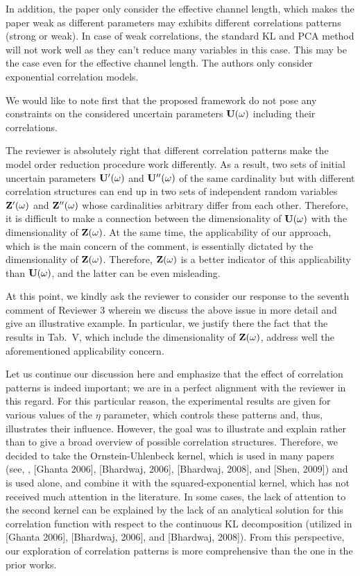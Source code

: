 \begin{reviewer}
In addition, the paper only consider the effective channel length, which makes the paper weak as different parameters may exhibits different correlations patterns (strong or weak). In case of weak correlations, the standard KL and PCA method will not work well as they can’t reduce many variables in this case. This may be the case even for the effective channel length. The authors only consider exponential correlation models.
\end{reviewer}
\begin{authors}
We would like to note first that the proposed framework do not pose any constraints on the considered uncertain parameters $\mathbf{U}(\omega)$ including their correlations.

The reviewer is absolutely right that different correlation patterns make the model order reduction procedure work differently.
As a result, two sets of initial uncertain parameters $\mathbf{U}'(\omega)$ and $\mathbf{U}''(\omega)$ of the same cardinality but with different correlation structures can end up in two sets of independent random variables $\mathbf{Z}'(\omega)$ and $\mathbf{Z}''(\omega)$ whose cardinalities arbitrary differ from each other.
Therefore, it is difficult to make a connection between the dimensionality of $\mathbf{U}(\omega)$ with the dimensionality of $\mathbf{Z}(\omega)$.
At the same time, the applicability of our approach, which is the main concern of the comment, is essentially dictated by the dimensionality of $\mathbf{Z}(\omega)$.
Therefore, $\mathbf{Z}(\omega)$ is a better indicator of this applicability than $\mathbf{U}(\omega)$, and the latter can be even misleading.

At this point, we kindly ask the reviewer to consider our response to the seventh comment of Reviewer 3 wherein we discuss the above issue in more detail and give an illustrative example.
In particular, we justify there the fact that the results in Tab.~V, which include the dimensionality of $\mathbf{Z}(\omega)$, address well the aforementioned applicability concern.

Let us continue our discussion here and emphasize that the effect of correlation patterns is indeed important; we are in a perfect alignment with the reviewer in this regard.
For this particular reason, the experimental results are given for various values of the $\eta$ parameter, which controls these patterns and, thus, illustrates their influence.
However, the goal was to illustrate and explain rather than to give a broad overview of possible correlation structures.
Therefore, we decided to take the Ornstein-Uhlenbeck kernel, which is used in many papers (see, \eg, [Ghanta 2006], [Bhardwaj, 2006], [Bhardwaj, 2008], and [Shen, 2009]) and is used alone, and combine it with the squared-exponential kernel, which has not received much attention in the literature.
In some cases, the lack of attention to the second kernel can be explained by the lack of an analytical solution for this correlation function with respect to the continuous KL decomposition (utilized in [Ghanta 2006], [Bhardwaj, 2006], and [Bhardwaj, 2008]).
From this perspective, our exploration of correlation patterns is more comprehensive than the one in the prior works.


\end{authors}
